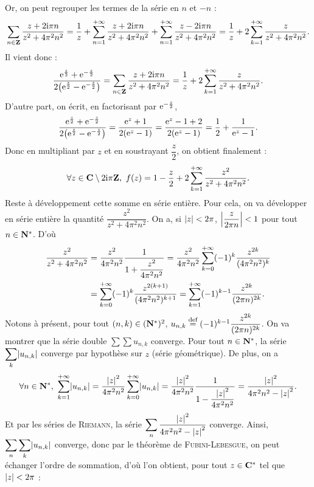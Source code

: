 \documentclass[ikea]{../ceri/sty/MasterArticle}
\begin{document}
\begin{demo}
    Or, on peut regrouper les termes de la série en $n$ et $-n$ :
    \[ \sum_{n\in\mathbf{Z}}\frac{z+2\mathrm{i}\pi n}{z^2+4\pi^2n^2} = \frac 1z + \sum_{n=1}^{+\infty}\frac{z+2\mathrm{i}\pi n}{z^2+4\pi^2n^2} + \sum_{n=1}^{+\infty}\frac{z-2\mathrm{i}\pi n}{z^2+4\pi^2n^2} = \frac 1z + 2\sum_{k=1}^{+\infty}\frac z{z^2+4\pi^2n^2}\text. \]
    Il vient donc :
    \[ \frac{\e^{\frac z2}+\e^{-\frac z2}}{2\left( \e^{\frac z2}-\e^{-\frac z2} \right)} = \sum_{n\in\Z}\frac{z+2\i\pi n}{z^2+4\pi^2n^2} = \frac 1z + 2\sum_{k=1}^{+\infty}\frac z{z^2+4\pi^2n^2}\text. \]
    D'autre part, on écrit, en factorisant par $\mathrm{e}^{-\frac z2}$,
    \[ \frac{\e^{\frac z2}+\e^{-\frac z2}}{2\left( \e^{\frac z2}-\e^{-\frac z2} \right)} = \frac{\e^z+1}{2(\e^z-1)} = \frac{\e^z-1+2}{2(\e^z-1)} = \frac 12 + \frac 1{\e^z-1}\text. \]
    Donc en multipliant par $z$ et en soustrayant $\dfrac z2$, on obtient finalement :
    \begin{equation*}
        \forall z\in\mathbf{C}\setminus 2\mathrm{i}\pi\mathbf{Z},\ f(z) = 1 - \frac z2 + 2\sum_{k=1}^{+\infty}\frac {z^2}{z^2+4\pi^2n^2}\text.\label{eq:1}
    \end{equation*}
    Reste à développement cette somme en série entière. Pour cela, on va développer en série entière la quantité $\dfrac{z^2}{z^2+4\pi^2n^2}$. On a, si $\abs z<2\pi$, $\abs{\dfrac z{2\pi n}}<1$ pour tout $n\in\mathbf{N}^*$. D'où
    \begin{align*}
        \frac{z^2}{z^2+4\pi^2n^2} & = \frac{z^2}{4\pi^2n^2}\frac{1}{1+\dfrac{z^2}{4\pi^2n^2}} = \frac{z^2}{4\pi^2n^2}\sum_{k=0}^{+\infty}(-1)^k\frac{z^{2k}}{(4\pi^2n^2)^k} \\
                                  & = \sum_{k=0}^{+\infty}(-1)^k\frac{z^{2(k+1)}}{(4\pi^2n^2)^{k+1}} = \sum_{k=1}^{+\infty}(-1)^{k-1}\frac{z^{2k}}{(2\pi n)^{2k}}\text.
    \end{align*}
    Notons à présent, pour tout $(n,k)\in(\mathbf{N}^*)^2$, $u_{n,k}\overset{\text{def}}=(-1)^{k-1}\dfrac{z^{2k}}{(2\pi n)^{2k}}$. On va montrer que la série double $\sum\sum u_{n,k}$ converge. Pour tout $n\in\mathbf{N}^*$, la série $\displaystyle\sum_k\abs{u_{n,k}}$ converge par hypothèse sur $z$ (série géométrique). De plus, on a
    \[ \forall n\in\N^*,\ \sum_{k=1}^{+\infty}\abs{u_{n,k}} = \frac{\abs z^2}{4\pi^2n^2}\sum_{k=0}^{+\infty}\abs{u_{n,k}} = \frac{\abs z^2}{4\pi^2n^2}\frac 1{1-\dfrac{\abs z^2}{4\pi^2n^2}} = \frac{\abs z^2}{4\pi^2n^2-\abs z^2}\text. \]
    Et par les séries de \textsc{Riemann}, la série $\displaystyle\sum_n\frac{\abs z^2}{4\pi^2n^2-\abs z^2}$ converge. Ainsi, $\displaystyle\sum_n\sum_k \abs{u_{n,k}}$ converge, donc par le théorème de \textsc{Fubini-Lebesgue}, on peut échanger l'ordre de sommation, d'où l'on obtient, pour tout $z\in\mathbf{C}^*$ tel que $\abs z<2\pi$ :

\end{demo}
\end{document}
